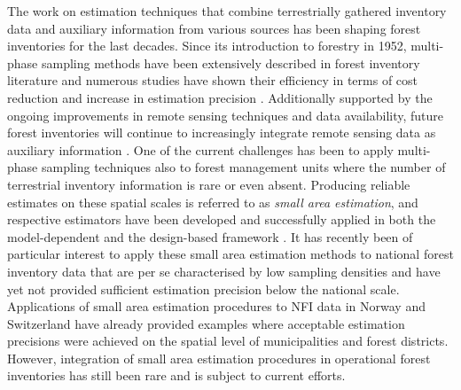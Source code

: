 The work on estimation techniques that combine terrestrially gathered inventory data and auxiliary information from various sources has been shaping forest inventories for the last decades. Since its introduction to forestry in 1952, multi-phase sampling methods have been extensively described in forest inventory literature \citep[e.g.,][]{gregoire2007, kohl2006, kangas2006, schreuder1993, mandallaz2008, saborowski2010, vonLuepke2012, mandallaz2013c} and numerous studies have shown their efficiency in terms of cost reduction and increase in estimation precision \citep[e.g.,][]{ bockmann1998, vonluepke2013, mandallaz2013b, massey2015_thesis}. Additionally supported by the ongoing improvements in remote sensing techniques and data availability, future forest inventories will continue to increasingly integrate remote sensing data as auxiliary information \citep{kangas2018}. One of the current challenges has been to apply multi-phase sampling techniques also to forest management units where the number of terrestrial inventory information is rare or even absent. Producing reliable estimates on these spatial scales is referred to as \textit{small area estimation}, and respective estimators have been developed and successfully applied in both the model-dependent \citep{naesset1997b, breidenbach2016} and the design-based framework \citep{mandallaz2013a, mandallaz2013b, mandallaz2013c}. It has recently been of particular interest to apply these small area estimation methods to national forest inventory data that are per se characterised by low sampling densities and have yet not provided sufficient estimation precision below the national scale. Applications of small area estimation procedures to NFI data in Norway \citep{breidenbach2012} and Switzerland \citep{magnussen2014a} have already provided examples where acceptable estimation precisions were achieved on the spatial level of municipalities and forest districts. However, integration of small area estimation procedures in operational forest inventories has still been rare and is subject to current efforts.

%
%






